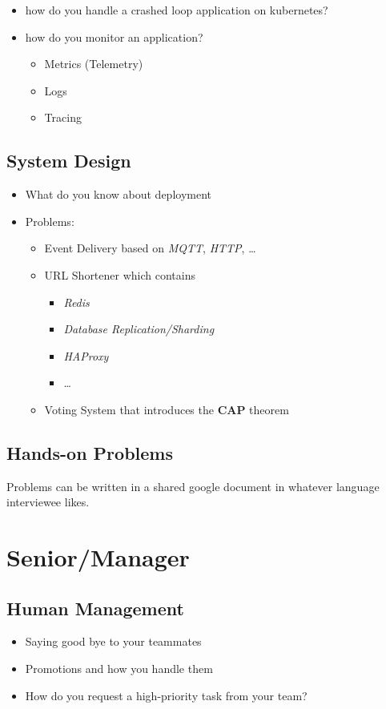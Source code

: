 \documentclass[]{book}
\begin{document}
\begin{itemize}
  \item how do you handle a crashed loop application on kubernetes?
  \item how do you monitor an application?
    \begin{itemize}
      \item Metrics (Telemetry)
      \item Logs
      \item Tracing
    \end{itemize}
\end{itemize}

\section{System Design}

\begin{itemize}
  \item What do you know about deployment
  \item Problems:
    \begin{itemize}
      \item Event Delivery based on \textit{MQTT}, \textit{HTTP}, \ldots
      \item URL Shortener which contains
        \begin{itemize}
          \item \textit{Redis}
          \item \textit{Database Replication/Sharding}
          \item \textit{HAProxy}
          \item \ldots
        \end{itemize}
      \item Voting System that introduces the \textbf{CAP} theorem
    \end{itemize}
\end{itemize}

\section{Hands-on Problems}

Problems can be written in a shared google document in whatever language interviewee likes.







\chapter{Senior/Manager}

\section{Human Management}

\begin{itemize}
  \item Saying good bye to your teammates
  \item Promotions and how you handle them
  \item How do you request a high-priority task from your team?
\end{itemize}
\end{document}
